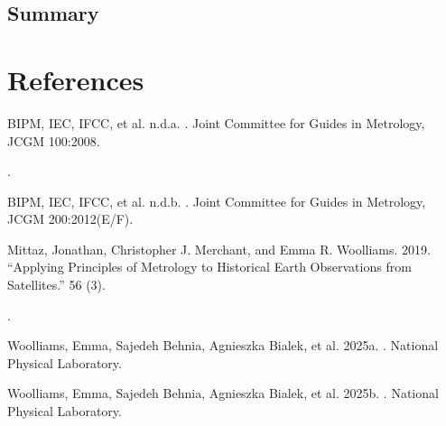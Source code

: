 \documentclass[a4paper,10pt,english]{sphinxmanual}
\begin{document}
\subsection{Summary}
\label{\detokenize{04_uncertainty_analysis:summary}}

\section{References}
\label{\detokenize{04_uncertainty_analysis:references}}\label{\detokenize{04_uncertainty_analysis:ref-jcgmgum}}
\sphinxAtStartPar
BIPM, IEC, IFCC, et al. n.d.\sphinxhyphen{}a. . Joint Committee for Guides in
Metrology, JCGM 100:2008. %
\begin{footnote}[11]\sphinxAtStartFootnote
{}
%
\end{footnote}.

\label{\detokenize{04_uncertainty_analysis:ref-jcgmvim}}
\sphinxAtStartPar
BIPM, IEC, IFCC, et al. n.d.\sphinxhyphen{}b. . Joint Committee for Guides in
Metrology, JCGM 200:2012(E/F).

\label{\detokenize{04_uncertainty_analysis:ref-mittaz19}}
\sphinxAtStartPar
Mittaz, Jonathan, Christopher J. Merchant, and Emma R. Woolliams. 2019.
“Applying Principles of Metrology to Historical Earth Observations from
Satellites.”  56 (3).
%
\begin{footnote}[12]\sphinxAtStartFootnote
{}
%
\end{footnote}.

\label{\detokenize{04_uncertainty_analysis:ref-qa4eo1}}
\sphinxAtStartPar
Woolliams, Emma, Sajedeh Behnia, Agnieszka Bialek, et al. 2025a. . National Physical Laboratory.

\label{\detokenize{04_uncertainty_analysis:ref-qa4eo2}}
\sphinxAtStartPar
Woolliams, Emma, Sajedeh Behnia, Agnieszka Bialek, et al. 2025b. . National Physical Laboratory.
\end{document}
